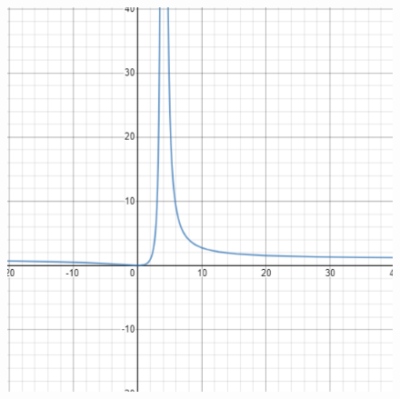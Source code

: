 \documentclass{article}
\begin{document}
\begin{enumerate}[label=\textbf{(13.\arabic*)}]
\begin{enumerate}[label=(\alph*)]
\begin{figure}[H]
\includegraphics[scale=.5]{graph8}
\end{figure}
\end{enumerate}

\newpage


\end{enumerate}
\end{document}
